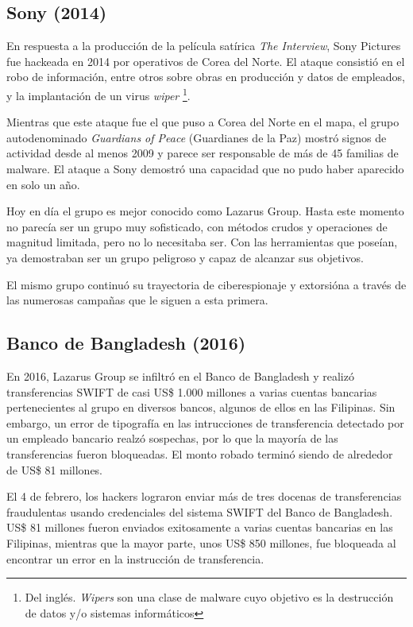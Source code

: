 \documentclass{article}
\begin{document}

\subsection{Sony (2014)}
En respuesta a la producción de la película satírica {\it The Interview}, Sony Pictures fue hackeada en 2014 por operativos de Corea del Norte. El ataque consistió en el robo de información, entre otros sobre obras en producción y datos de empleados, y la implantación de un virus {\it wiper} \footnote{Del inglés. {\it Wipers} son una clase de malware cuyo objetivo es la destrucción de datos y/o sistemas informáticos}.

Mientras que este ataque fue el que puso a Corea del Norte en el mapa, el grupo autodenominado {\it Guardians of Peace} (Guardianes de la Paz) mostró signos de actividad desde al menos 2009 y parece ser responsable de más de 45 familias de malware. El ataque a Sony demostró una capacidad que no pudo haber aparecido en solo un año.

Hoy en día el grupo es mejor conocido como Lazarus Group. Hasta este momento no parecía ser un grupo muy sofisticado, con métodos crudos y operaciones de magnitud limitada, pero no lo necesitaba ser. Con las herramientas que poseían, ya demostraban ser un grupo peligroso y capaz de alcanzar sus objetivos. \autocite{wired-sony}

El mismo grupo continuó su trayectoria de ciberespionaje y extorsióna a través de las numerosas campañas que le siguen a esta primera.

\subsection{Banco de Bangladesh (2016)}
En 2016, Lazarus Group se infiltró en el Banco de Bangladesh y realizó transferencias SWIFT de casi US\$ 1.000 millones a varias cuentas bancarias pertenecientes al grupo en diversos bancos, algunos de ellos en las Filipinas. Sin embargo, un error de tipografía en las intrucciones de transferencia detectado por un empleado bancario realzó sospechas, por lo que la mayoría de las transferencias fueron bloqueadas. El monto robado terminó siendo de alrededor de US\$ 81 millones.

El 4 de febrero, los hackers lograron enviar más de tres docenas de transferencias fraudulentas usando credenciales del sistema SWIFT del Banco de Bangladesh. US\$ 81 millones fueron enviados exitosamente a varias cuentas bancarias en las Filipinas, mientras que la mayor parte, unos US\$ 850 millones, fue bloqueada al encontrar un error en la instrucción de transferencia.
\end{document}
